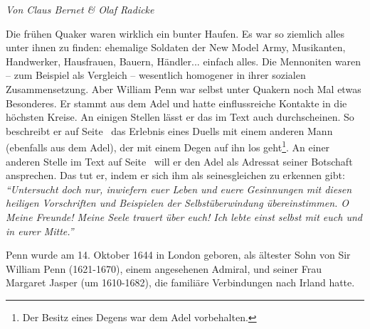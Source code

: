 %
%
%


\begin{flushright}
\begin{footnotesize}
\textit{Von Claus Bernet \& Olaf Radicke}
\end{footnotesize}
\end{flushright}
\smallskip

Die frühen Quaker waren wirklich ein bunter Haufen. Es war so ziemlich alles
unter ihnen zu finden: ehemalige Soldaten der New Model Army, Musikanten, Handwerker, Hausfrauen, Bauern, Händler... einfach alles.
Die Mennoniten waren --
zum Beispiel als Vergleich -- wesentlich homogener in ihrer sozialen Zusammensetzung.
Aber
William Penn war selbst unter Quakern noch Mal etwas Besonderes. Er stammt aus
dem Adel und hatte einflussreiche Kontakte in die höchsten Kreise. An einigen
Stellen lässt er das im Text auch durchscheinen. So beschreibt er auf
Seite~\pageref{kap9_ab2_duell_penn} das Erlebnis eines Duells
mit einem anderen Mann (ebenfalls aus dem Adel), der mit einem Degen auf ihn los
geht\footnote{Der Besitz eines
Degens war dem Adel vorbehalten.}. An einer anderen Stelle im Text auf
Seite~\pageref{15_04_penn_alte_freunde} will er den Adel als Adressat seiner
Botschaft ansprechen. Das tut er, indem er sich ihm als seinesgleichen zu erkennen
gibt:
\textit{"`Untersucht doch nur, inwiefern euer Leben und euere Gesinnungen mit
diesen heiligen Vorschriften und Beispielen der Selbstüberwindung
übereinstimmen. O Meine Freunde! Meine Seele trauert über euch! Ich lebte einst
selbst mit euch und in eurer Mitte."'}

\medskip

Penn wurde am 14. Oktober 1644 in London geboren, als ältester Sohn von Sir William Penn
(1621-1670), einem angesehenen Admiral, und
seiner Frau Margaret Jasper (um 1610-1682),
die familiäre Verbindungen nach Irland hatte.
\medskip

